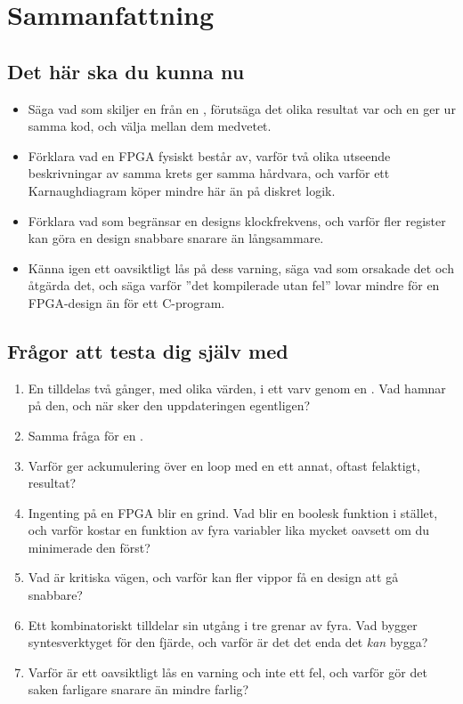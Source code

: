 
\section{Sammanfattning}
\label{c5:sec:review}

\subsection*{Det här ska du kunna nu}
\begin{itemize}
  \item Säga vad som skiljer en  från en , förutsäga det olika resultat
    var och en ger ur samma kod, och välja mellan dem medvetet.
  \item Förklara vad en FPGA fysiskt består av, varför två olika utseende beskrivningar av samma
    krets ger samma hårdvara, och varför ett Karnaughdiagram köper mindre här än på diskret logik.
  \item Förklara vad som begränsar en designs klockfrekvens, och varför fler register kan göra en
    design snabbare snarare än långsammare.
  \item Känna igen ett oavsiktligt lås på dess varning, säga vad som orsakade det och åtgärda det,
    och säga varför ”det kompilerade utan fel” lovar mindre för en FPGA-design än för ett
    C-program.
\end{itemize}

\subsection*{Frågor att testa dig själv med}
\begin{enumerate}
  \item En  tilldelas två gånger, med olika värden, i ett varv genom en
    . Vad hamnar på den, och när sker den uppdateringen egentligen?
  \item Samma fråga för en .
  \item Varför ger ackumulering över en loop med en  ett annat, oftast felaktigt,
    resultat?
  \item Ingenting på en FPGA blir en grind. Vad blir en boolesk funktion i stället, och varför
    kostar en funktion av fyra variabler lika mycket oavsett om du minimerade den först?
  \item Vad är kritiska vägen, och varför kan fler vippor få en design att gå snabbare?
  \item Ett kombinatoriskt  tilldelar sin utgång i tre grenar av fyra. Vad bygger
    syntesverktyget för den fjärde, och varför är det det enda det \emph{kan} bygga?
  \item Varför är ett oavsiktligt lås en varning och inte ett fel, och varför gör det saken
    farligare snarare än mindre farlig?
\end{enumerate}

